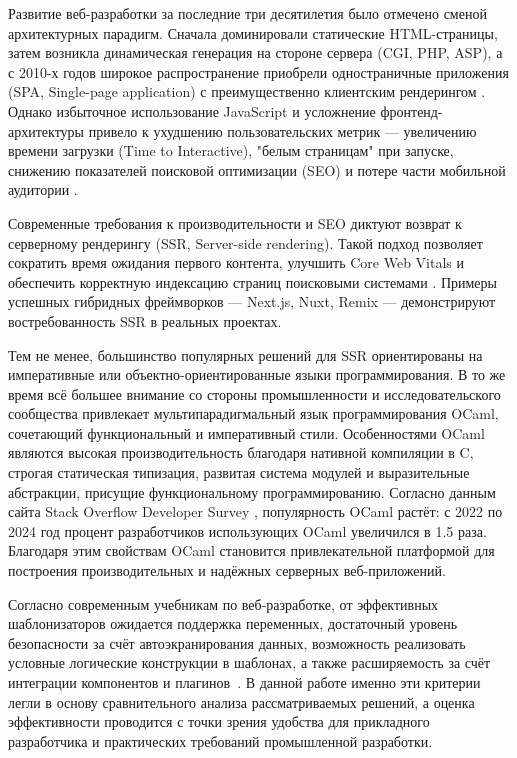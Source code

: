 Развитие веб-разработки за последние три десятилетия было отмечено сменой архитектурных парадигм.
Сначала доминировали статические HTML-страницы, затем возникла динамическая генерация на стороне сервера (CGI, PHP, ASP), а с 2010-х годов широкое распространение приобрели одностраничные приложения (SPA, Single-page application) с преимущественно клиентским рендерингом \cite{Fowler2004, Osmani2017}.
Однако избыточное использование JavaScript и усложнение фронтенд-архитектуры привело к ухудшению пользовательских метрик — увеличению времени загрузки (Time to Interactive), "белым страницам" при запуске, снижению показателей поисковой оптимизации (SEO) и потере части мобильной аудитории \cite{GoogleLighthouse2021, HTTPArchive2022}.

Современные требования к производительности и SEO диктуют возврат к серверному рендерингу (SSR, Server-side rendering).
Такой подход позволяет сократить время ожидания первого контента, улучшить Core Web Vitals и обеспечить корректную индексацию страниц поисковыми системами \cite{ShopifyHydrogen2021}.
Примеры успешных гибридных фреймворков — Next.js, Nuxt, Remix — демонстрируют востребованность SSR в реальных проектах.

Тем не менее, большинство популярных решений для SSR ориентированы на императивные или объектно-ориентированные языки программирования.
В то же время всё большее внимание со стороны промышленности и исследовательского сообщества привлекает мультипарадигмальный язык программирования OCaml, сочетающий функциональный и императивный стили.
Особенностями OCaml являются высокая производительность благодаря нативной компиляции в C, строгая статическая типизация, развитая система модулей и выразительные абстракции, присущие функциональному программированию.
Согласно данным сайта Stack Overflow Developer Survey \cite{StackOverflow2022, StackOverflow2022}, популярность OCaml растёт: с 2022 по 2024 год процент разработчиков использующих OCaml увеличился в 1.5 раза.
Благодаря этим свойствам OCaml становится привлекательной платформой для построения производительных и надёжных серверных веб-приложений.

Согласно современным учебникам по веб-разработке, от эффективных шаблонизаторов ожидается поддержка переменных, достаточный уровень безопасности за счёт автоэкранирования данных, возможность реализовать условные логические конструкции в шаблонах, а также расширяемость за счёт интеграции компонентов и плагинов~\cite{Osipov2022}.
В данной работе именно эти критерии легли в основу сравнительного анализа рассматриваемых решений, а оценка эффективности проводится с точки зрения удобства для прикладного разработчика и практических требований промышленной разработки.

